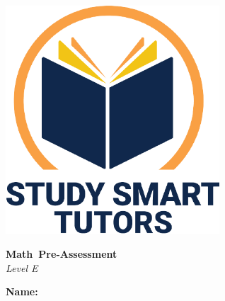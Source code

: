 \documentclass[12pt]{article}
\title{}
\date{}
\newcommand{\subject}{Math}
\newcommand{\assessmenttype}{Pre-Assessment}
\newcommand{\levelLetter}{E}
\begin{document}
\thispagestyle{empty}

\vspace*{\fill}

\vspace*{3cm}

\begin{center}

    \includegraphics[width=0.6\textwidth]{SST_Color_Logo.png} %
    
    \vspace{1cm} %
    
    
    \Huge \textbf{\subject \ \assessmenttype }\\ 
     \vspace{1 cm}
      \LARGE \textit{Level \levelLetter}\\[1cm]
 \vspace{0.5cm}
    
   


    \LARGE \textbf{Name:} \underline{\hspace{8cm}}

    
    \vfill %
    
\end{center}


\newpage
\thispagestyle{empty}
\vspace*{\fill}
\newpage


\newpage


\end{document}
